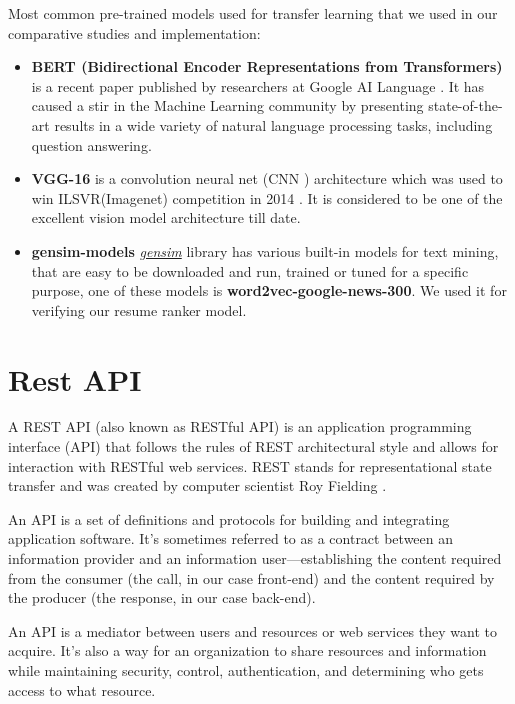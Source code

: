 Most common pre-trained models used for transfer learning that we used in our comparative studies and implementation:

\begin{itemize}
    \item \textbf{BERT (Bidirectional Encoder Representations from Transformers)} is a recent paper published by researchers at Google AI Language \cite{bert}. It has caused a stir in the Machine Learning community by presenting state-of-the-art results in a wide variety of natural language processing tasks, including question answering.
    
    \item \textbf{VGG-16} is a convolution neural net (CNN ) architecture which was used to win ILSVR(Imagenet) competition in 2014 \cite{vgg}. It is considered to be one of the excellent vision model architecture till date.
    
    \item \textbf{gensim-models} \href{https://radimrehurek.com/gensim/}{\textit{gensim}} library has various built-in models for text mining, that are easy to be downloaded and run, trained or tuned for a specific purpose, one of these models is \textbf{word2vec-google-news-300}. We used it for verifying our resume ranker model.
\end{itemize}


\newpage

\section{Rest API}
\label{sec:Rest API}
A REST API (also known as RESTful API) is an application programming interface (API) that follows the rules of REST architectural style and allows for interaction with RESTful web services. REST stands for representational state transfer and was created by computer scientist Roy Fielding \cite{rest}.

An API is a set of definitions and protocols for building and integrating application software. It’s sometimes referred to as a contract between an information provider and an information user—establishing the content required from the consumer (the call, in our case front-end) and the content required by the producer (the response, in our case back-end). 

An API is a mediator between users and resources or web services they want to acquire. It’s also a way for an organization to share resources and information while maintaining security, control, authentication, and determining who gets access to what resource.

